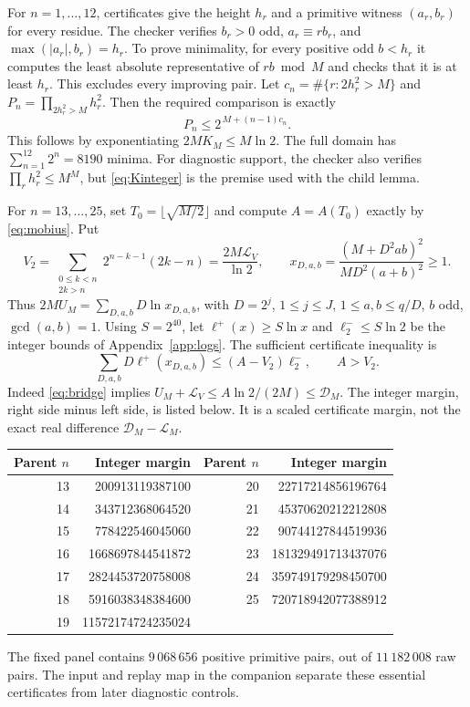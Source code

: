 \documentclass[11pt,a4paper]{article}
\numberwithin{equation}{section}
\theoremstyle{remark}
\begin{document}
For $n=1,\ldots,12$, certificates give the height $h_r$ and a primitive
witness $(a_r,b_r)$ for every residue. The checker verifies
$b_r>0$ odd, $a_r\equiv rb_r$, and
$\max(|a_r|,b_r)=h_r$. To prove minimality, for every positive odd $b<h_r$
it computes the least absolute representative of $rb\bmod M$ and
checks that it is at least $h_r$. This excludes every improving pair.
Let $c_n=\#\{r:2h_r^2>M\}$ and
$P_n=\prod_{2h_r^2>M}h_r^2$. Then the required comparison is exactly
\begin{equation}\label{eq:Kinteger}
                P_n\le 2^{\,M+(n-1)c_n}.
\end{equation}
This follows by exponentiating $2MK_M\le M\ln2$.
The full domain has $\sum_{n=1}^{12}2^n=8190$ minima.
For diagnostic support, the checker also verifies
$\prod_r h_r^2\le M^M$, but \eqref{eq:Kinteger} is the premise used
with the child lemma.

For $n=13,\ldots,25$, set $T_0=\lfloor\sqrt{M/2}\rfloor$ and compute
$A=A(T_0)$ exactly by \eqref{eq:mobius}. Put
\[
 V_2=\sum_{\substack{0\le k<n\\2k>n}}
                2^{n-k-1}(2k-n)=\frac{2M\mathcal L_V}{\ln2},
 \qquad
 x_{D,a,b}=\frac{(M+D^2ab)^2}{MD^2(a+b)^2}\ge1.
\]
Thus $2MU_M=\sum_{D,a,b}D\ln x_{D,a,b}$, with
$D=2^j$, $1\le j\le J$, $1\le a,b\le q/D$, $b$ odd, $\gcd(a,b)=1$.
Using $S=2^{40}$, let $\ell^+(x)\ge S\ln x$ and
$\ell^-_2\le S\ln2$ be the integer bounds of
Appendix~\ref{app:logs}. The sufficient certificate inequality is
\begin{equation}\label{eq:bridge}
 \sum_{D,a,b}D\ell^+(x_{D,a,b})\le(A-V_2)\ell^-_2,\qquad A>V_2.
\end{equation}
Indeed \eqref{eq:bridge} implies
$U_M+\mathcal L_V\le A\ln2/(2M)\le\mathcal D_M$.
The integer margin, right side minus left side, is listed below.
It is a scaled certificate margin, not the exact real difference
$\mathcal D_M-\mathcal L_M$.

\begin{center}
\begin{tabular}{rr@{\qquad}rr}
\toprule
Parent $n$&Integer margin&Parent $n$&Integer margin\\
\midrule
13&200913119387100&20&22717214856196764\\
14&343712368064520&21&45370620212212808\\
15&778422546045060&22&90744127844519936\\
16&1668697844541872&23&181329491713437076\\
17&2824453720758008&24&359749179298450700\\
18&5916038348384600&25&720718942077388912\\
19&11572174724235024&&\\
\bottomrule
\end{tabular}
\end{center}
The fixed panel contains $9\,068\,656$ positive primitive pairs, out of
$11\,182\,008$ raw pairs. The input and replay map in the companion separate
these essential certificates from later diagnostic controls.
\end{document}
